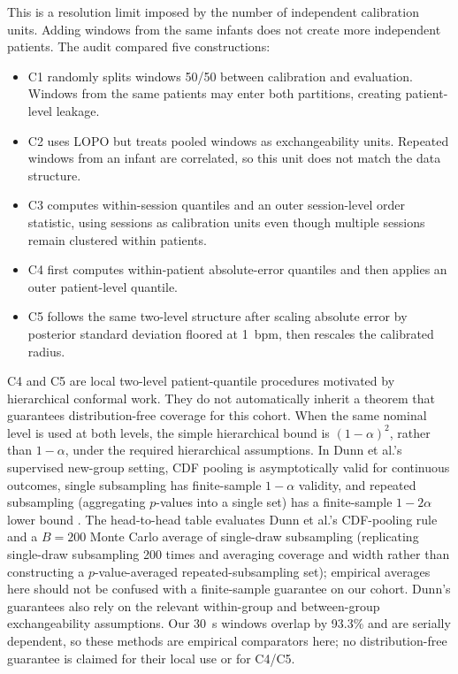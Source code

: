 This is a resolution limit imposed by the number of independent calibration units. Adding windows from the same infants does not create more independent patients. The audit compared five constructions:
\begin{itemize}
\item C1 randomly splits windows 50/50 between calibration and evaluation. Windows from the same patients may enter both partitions, creating patient-level leakage.
\item C2 uses LOPO but treats pooled windows as exchangeability units. Repeated windows from an infant are correlated, so this unit does not match the data structure.
\item C3 computes within-session quantiles and an outer session-level order statistic, using sessions as calibration units even though multiple sessions remain clustered within patients.
\item C4 first computes within-patient absolute-error quantiles and then applies an outer patient-level quantile.
\item C5 follows the same two-level structure after scaling absolute error by posterior standard deviation floored at 1~bpm, then rescales the calibrated radius.
\end{itemize}

C4 and C5 are local two-level patient-quantile procedures motivated by hierarchical conformal work. They do not automatically inherit a theorem that guarantees distribution-free coverage for this cohort. When the same nominal level is used at both levels, the simple hierarchical bound is $(1-\alpha)^2$, rather than $1-\alpha$, under the required hierarchical assumptions. In Dunn et al.'s supervised new-group setting, CDF pooling is asymptotically valid for continuous outcomes, single subsampling has finite-sample $1-\alpha$ validity, and repeated subsampling (aggregating $p$-values into a single set) has a finite-sample $1-2\alpha$ lower bound \citep{dunn2023distribution}. The head-to-head table evaluates Dunn et al.'s CDF-pooling rule and a $B=200$ Monte Carlo average of single-draw subsampling (replicating single-draw subsampling 200 times and averaging coverage and width rather than constructing a $p$-value-averaged repeated-subsampling set); empirical averages here should not be confused with a finite-sample guarantee on our cohort. Dunn's guarantees also rely on the relevant within-group and between-group exchangeability assumptions. Our 30~s windows overlap by 93.3\% and are serially dependent, so these methods are empirical comparators here; no distribution-free guarantee is claimed for their local use or for C4/C5.

